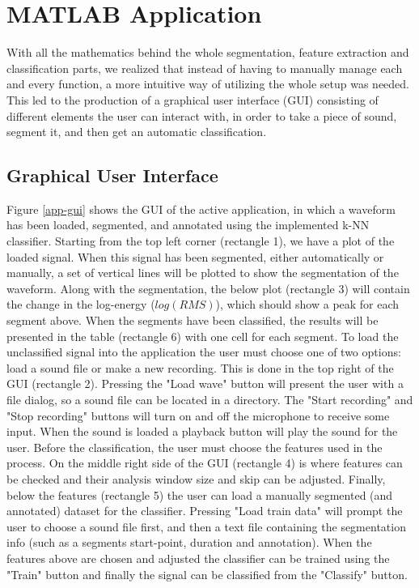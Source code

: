 \section{MATLAB Application}
With all the mathematics behind the whole segmentation, feature extraction and classification parts, we realized that instead of having to manually manage each and every function, a more intuitive way of utilizing the whole setup was needed. This led to the production of a graphical user interface (GUI) consisting of different elements the user can interact with, in order to take a piece of sound, segment it, and then get an automatic classification.

\subsection{Graphical User Interface}
Figure \ref{app-gui} shows the GUI of the active application, in which a waveform has been loaded, segmented, and annotated using the implemented k-NN classifier. Starting from the top left corner (rectangle 1), we have a plot of the loaded signal. When this signal has been segmented, either automatically or manually, a set of vertical lines will be plotted to show the segmentation of the waveform. Along with the segmentation, the below plot (rectangle 3) will contain the change in the log-energy ($log(RMS)$), which should show a peak for each segment above. When the segments have been classified, the results will be presented in the table (rectangle 6) with one cell for each segment. To load the unclassified signal into the application the user must choose one of two options: load a sound file or make a new recording. This is done in the top right of the GUI (rectangle 2). Pressing the "Load wave" button will present the user with a file dialog, so a sound file can be located in a directory. The "Start recording" and "Stop recording" buttons will turn on and off the microphone to receive some input. When the sound is loaded a playback button will play the sound for the user. Before the classification, the user must choose the features used in the process. On the middle right side of the GUI (rectangle 4) is where features can be checked and their analysis window size and skip can be adjusted. Finally, below the features (rectangle 5) the user can load a manually segmented (and annotated) dataset for the classifier. Pressing "Load train data" will prompt the user to choose a sound file first, and then a text file containing the segmentation info (such as a segments start-point, duration and annotation). When the features above are chosen and adjusted the classifier can be trained using the "Train" button and finally the signal can be classified from the "Classify" button.

